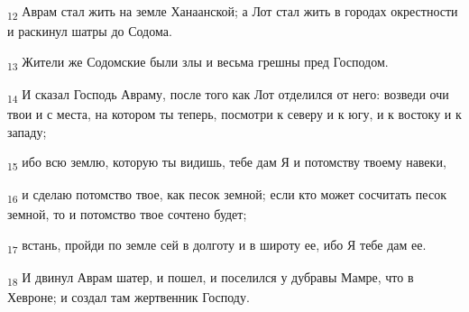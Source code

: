 \begin{tcolorbox}
\textsubscript{12} Аврам стал жить на земле Ханаанской; а Лот стал жить в городах окрестности и раскинул шатры до Содома.
\end{tcolorbox}
\begin{tcolorbox}
\textsubscript{13} Жители же Содомские были злы и весьма грешны пред Господом.
\end{tcolorbox}
\begin{tcolorbox}
\textsubscript{14} И сказал Господь Авраму, после того как Лот отделился от него: возведи очи твои и с места, на котором ты теперь, посмотри к северу и к югу, и к востоку и к западу;
\end{tcolorbox}
\begin{tcolorbox}
\textsubscript{15} ибо всю землю, которую ты видишь, тебе дам Я и потомству твоему навеки,
\end{tcolorbox}
\begin{tcolorbox}
\textsubscript{16} и сделаю потомство твое, как песок земной; если кто может сосчитать песок земной, то и потомство твое сочтено будет;
\end{tcolorbox}
\begin{tcolorbox}
\textsubscript{17} встань, пройди по земле сей в долготу и в широту ее, ибо Я тебе дам ее.
\end{tcolorbox}
\begin{tcolorbox}
\textsubscript{18} И двинул Аврам шатер, и пошел, и поселился у дубравы Мамре, что в Хевроне; и создал там жертвенник Господу.
\end{tcolorbox}
